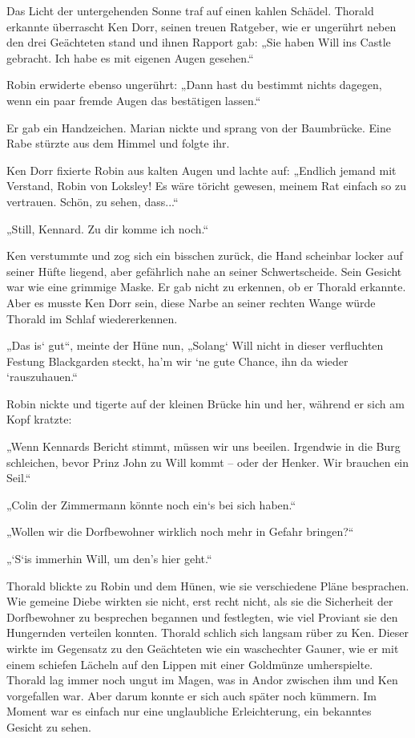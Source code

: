 Das Licht der untergehenden Sonne traf auf einen kahlen Schädel. Thorald erkannte überrascht Ken Dorr, seinen treuen Ratgeber, wie er ungerührt neben den drei Geächteten stand und ihnen Rapport gab: „Sie haben Will ins Castle gebracht. Ich habe es mit eigenen Augen gesehen.“

Robin erwiderte ebenso ungerührt: „Dann hast du bestimmt nichts dagegen, wenn ein paar fremde Augen das bestätigen lassen.“

Er gab ein Handzeichen. Marian nickte und sprang von der Baumbrücke. Eine Rabe stürzte aus dem Himmel und folgte ihr.

Ken Dorr fixierte Robin aus kalten Augen und lachte auf: „Endlich jemand mit Verstand, Robin von Loksley! Es wäre töricht gewesen, meinem Rat einfach so zu vertrauen. Schön, zu sehen, dass...“

„Still, Kennard. Zu dir komme ich noch.“

Ken verstummte und zog sich ein bisschen zurück, die Hand scheinbar locker auf seiner Hüfte liegend, aber gefährlich nahe an seiner Schwertscheide. Sein Gesicht war wie eine grimmige Maske. Er gab nicht zu erkennen, ob er Thorald erkannte. Aber es musste Ken Dorr sein, diese Narbe an seiner rechten Wange würde Thorald im Schlaf wiedererkennen.

„Das is‘ gut“, meinte der Hüne nun, „Solang‘ Will nicht in dieser verfluchten Festung Blackgarden steckt, ha’m wir ‘ne gute Chance, ihn da wieder ‘rauszuhauen.“

Robin nickte und tigerte auf der kleinen Brücke hin und her, während er sich am Kopf kratzte:

„Wenn Kennards Bericht stimmt, müssen wir uns beeilen. Irgendwie in die Burg schleichen, bevor Prinz John zu Will kommt – oder der Henker. Wir brauchen ein Seil.“

„Colin der Zimmermann könnte noch ein‘s bei sich haben.“

„Wollen wir die Dorfbewohner wirklich noch mehr in Gefahr bringen?“

„‘S‘is immerhin Will, um den’s hier geht.“

Thorald blickte zu Robin und dem Hünen, wie sie verschiedene Pläne besprachen. Wie gemeine Diebe wirkten sie nicht, erst recht nicht, als sie die Sicherheit der Dorfbewohner zu besprechen begannen und festlegten, wie viel Proviant sie den Hungernden verteilen konnten. Thorald schlich sich langsam rüber zu Ken. Dieser wirkte im Gegensatz zu den Geächteten wie ein waschechter Gauner, wie er mit einem schiefen Lächeln auf den Lippen mit einer Goldmünze umherspielte. Thorald lag immer noch ungut im Magen, was in Andor zwischen ihm und Ken vorgefallen war. Aber darum konnte er sich auch später noch kümmern. Im Moment war es einfach nur eine unglaubliche Erleichterung, ein bekanntes Gesicht zu sehen.

